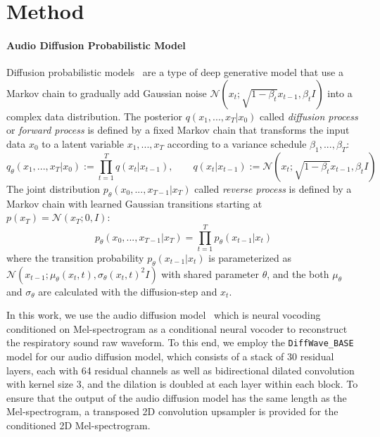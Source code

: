\documentclass{article}
\begin{document}
\section{Method}
\paragraph{Audio Diffusion Probabilistic Model} 
Diffusion probabilistic models~\cite{ho2020denoising} are a type of deep generative model that use a Markov chain to gradually add Gaussian noise $\mathcal{N}(x_{t};\sqrt{1-\beta_{t}}x_{t-1},\beta_{t}I)$ into a complex data distribution. 
The posterior $q(x_{1},...,x_{T}|x_{0})$ called \emph{diffusion process} or \emph{forward process} is defined by a fixed Markov chain that transforms the input data $x_{0}$ to a latent variable $x_{1},...,x_{T}$ according to a variance schedule $\beta_{1},...,\beta_{T}$:
\begin{equation}
    q_{\theta}(x_{1},...,x_{T}|x_{0})\! := \prod_{t=1}^{T}q(x_{t}|x_{t-1}),\, \, \, \, \, \, \, \, \, \, \, \,    q(x_{t}|x_{t-1}):=\mathcal{N}(x_{t};\sqrt{1-\beta_{t}}x_{t-1},\beta_{t}I)
\end{equation}
The joint distribution $p_{\theta}(x_{0},...,x_{T-1}|x_{T})$ called \emph{reverse process} is defined by a Markov chain with learned Gaussian transitions starting at $p(x_{T})=\mathcal{N}(x_{T}; 0, I)$:
\begin{equation}
    p_{\theta}(x_{0},...,x_{T-1}|x_{T})\! = \prod_{t=1}^{T}p_{\theta}(x_{t-1}|x_{t})
\end{equation}
where the transition probability $p_{\theta}(x_{t-1}|x_{t})$ is parameterized as $\mathcal{N}(x_{t-1};\mu_{\theta}(x_{t},t),\sigma_{\theta}(x_{t},t)^{2}I)$ with shared parameter $\theta$, and the both $\mu_{\theta}$ and $\sigma_{\theta}$ are calculated with the diffusion-step and $x_{t}$. 

In this work, we use the audio diffusion model~\cite{kong2020diffwave} which is neural vocoding conditioned on Mel-spectrogram as a conditional neural vocoder to reconstruct the respiratory sound raw waveform. To this end, we employ the \verb|DiffWave_BASE| model for our audio diffusion model, which consists of a stack of 30 residual layers, each with 64 residual channels as well as bidirectional dilated convolution with kernel size 3, and the dilation is doubled at each layer within each block. To ensure that the output of the audio diffusion model has the same length as the Mel-spectrogram, a transposed 2D convolution upsampler is provided for the conditioned 2D Mel-spectrogram. 
\end{document}
